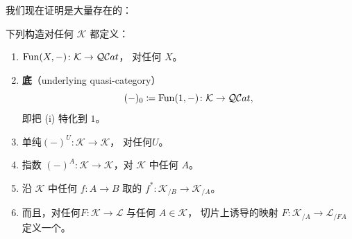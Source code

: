 我们现在证明\trCosmologicalFunctor{}是大量存在的：

\begin{proposition}\label{prop:cosmological-functor-constructions}
下列构造对任何\trInfinityCosmos{} $\mathcal{K}$ 都定义\trCosmologicalFunctor{}：
\begin{enumerate}[label=(\roman*)]
\item \trFunctorSpace $\operatorname{Fun}(X,-)\colon\mathcal{K}\to\mathcal{Q}\mathcal{C}at$，
  对任何\trInfinityCategory{} $X$。
\item \textbf{底\trQuasiCategory}（underlying quasi-category）\trFunctor
  \[
  (-)_0\coloneqq\operatorname{Fun}(1,-)\colon\mathcal{K}\to\mathcal{Q}\mathcal{C}at,
  \]
  即把 (i) 特化到\trTerminal{}\trInfinityCategory{} $1$。
\item 单纯\trCotensor $(-)^U\colon\mathcal{K}\to\mathcal{K}$，
  对任何\trSimplicialSet $U$。
\item 指数 $(-)^A\colon\mathcal{K}\to\mathcal{K}$，对\trCartesianClosed
  \trInfinityCosmos{} $\mathcal{K}$ 中任何\trInfinityCategory{} $A$。
\item 沿\trInfinityCosmos{} $\mathcal{K}$ 中任何\trFunctor{}
  $f\colon A\to B$ 取\trIsofibration{}的\trPullback
  $f^\ast\colon\mathcal{K}_{/B}\to\mathcal{K}_{/A}$。
\item 而且，对任何\trCosmologicalFunctor $F\colon\mathcal{K}\to\mathcal{L}$
  与任何\trInfinityCategory{} $A\in\mathcal{K}$，
  切片上诱导的映射 $F\colon\mathcal{K}_{/A}\to\mathcal{L}_{/FA}$
  定义一个\trCosmologicalFunctor{}。
\end{enumerate}
\end{proposition}

